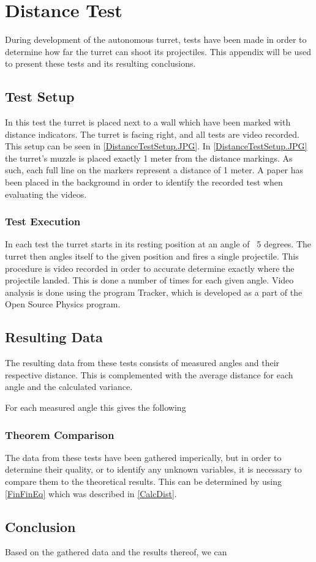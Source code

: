 \chapter{Distance Test}
During development of the autonomous turret, tests have been made in order to
determine how far the turret can shoot its projectiles. This appendix will be
used to present these tests and its resulting conclusions.

\section{Test Setup}
In this test the turret is placed next to a wall which have been marked with
distance indicators. The turret is facing right, and all tests are video
recorded. This setup can be seen in \autoref{DistanceTestSetup.JPG}.
 In \autoref{DistanceTestSetup.JPG} the turret's muzzle is placed exactly 1 meter
from the distance markings. As such, each full line on the markers represent a
distance of 1 meter. A paper has been placed in the background in order to
identify the recorded test when evaluating the videos.

\subsection{Test Execution}
In each test the turret starts in its resting position at an angle of ~5
degrees. The turret then angles itself to the given position and fires a single
projectile. This procedure is video recorded in order to accurate determine
exactly where the projectile landed. This is done a number of times for each
given angle. Video analysis is done using the program Tracker, which is
developed as a part of the Open Source Physics program.

\section{Resulting Data}
The resulting data from these tests consists of measured angles and their
respective distance. This is complemented with the average distance for each
angle and the calculated variance.


For each measured angle this gives the following 
\subsection{Theorem Comparison}
The data from these tests have been gathered imperically, but in order to
determine their quality, or to identify any unknown variables, it is necessary
to compare them to the theoretical results. This can be determined by using
\autoref{FinFinEq} which was described in \autoref{CalcDist}. 


\section{Conclusion}
Based on the gathered data and the results thereof, we can 
